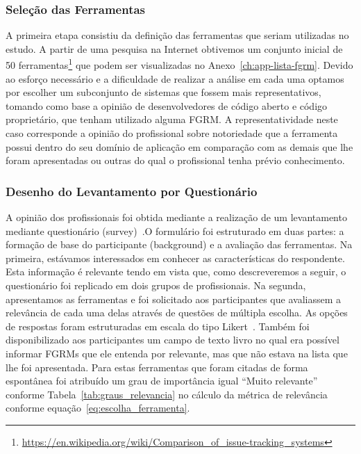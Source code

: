 \subsubsection{Seleção das Ferramentas}
\label{subsubsec:selecao-ferramentas}

A primeira etapa consistiu da definição das ferramentas que seriam utilizadas no
estudo. A partir de uma pesquisa na Internet obtivemos um conjunto inicial de 50
ferramentas\footnote{\url{https://en.wikipedia.org/wiki/Comparison_of_issue-tracking_systems}}
que podem ser visualizadas no Anexo~\ref{ch:app-lista-fgrm}. Devido ao esforço
necessário e a dificuldade de realizar a análise em cada uma optamos por
escolher um subconjunto de sistemas que fossem mais representativos, tomando
como base a opinião de desenvolvedores de código aberto e código proprietário,
que tenham utilizado alguma FGRM\@. A representatividade neste caso corresponde
a opinião do profissional sobre notoriedade que a ferramenta possui dentro do
seu domínio de aplicação em comparação com as demais que lhe foram apresentadas
ou outras do qual o profissional tenha prévio conhecimento.

\subsubsection{Desenho do Levantamento por Questionário}
\label{ssub:metodologia_desenho_da_pesquisa_com_profissionais}

A opinião dos profissionais foi obtida mediante a realização de um levantamento
mediante questionário (survey)~\cite{wohlin2012experimentation}.O formulário foi
estruturado em duas partes: a formação de base do participante (background) e a
avaliação das ferramentas. Na primeira, estávamos interessados em conhecer as
características do respondente. Esta informação é relevante tendo em vista que,
como descreveremos a seguir, o questionário foi replicado em dois grupos
de profissionais. Na segunda, apresentamos as ferramentas e foi
solicitado aos participantes que avaliassem a relevância de cada uma delas
através de questões de múltipla escolha. As opções de respostas foram
estruturadas em escala do tipo Likert~\cite{robbins2011plotting}. Também foi
disponibilizado aos participantes um campo de texto livro no qual era possível
informar FGRMs que ele entenda por relevante, mas que não estava na lista que
lhe foi apresentada. Para estas ferramentas que foram citadas de forma
espontânea foi atribuído um grau de importância igual ``Muito relevante''
conforme Tabela~\ref{tab:graus_relevancia} no cálculo da métrica de relevância
conforme equação~\ref{eq:escolha_ferramenta}.


